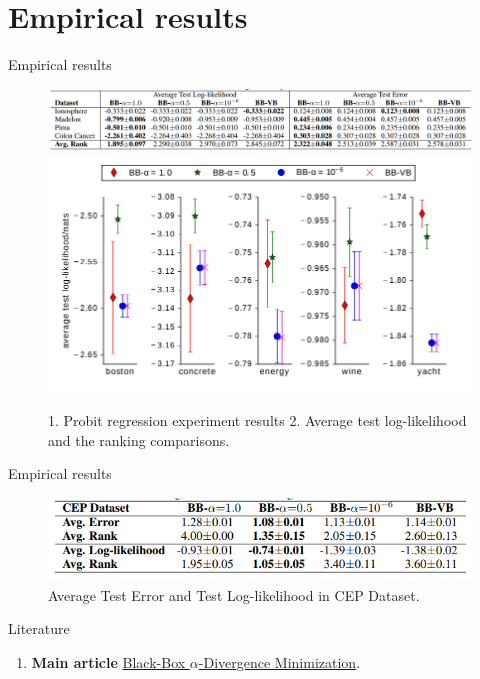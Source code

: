 \documentclass{beamer}
\begin{document}
\section{Empirical results}
\begin{frame}{Empirical results}
    \begin{figure}
        \centering
        \includegraphics[scale=0.62]{images/div_bmm_3.png}
        \includegraphics[scale=0.5]{images/div_bmm_4.png}
        \caption{1. Probit regression experiment results 
        2. Average test log-likelihood and the ranking comparisons.}
        \label{fig:enter-label}
    \end{figure}
\end{frame}

\begin{frame}{Empirical results}
    \begin{figure}
        \centering
        \includegraphics[scale=0.7]{images/div_bmm_5.png}
        \caption{Average Test Error and Test Log-likelihood in CEP Dataset.}
        \label{fig:enter-label}
    \end{figure}
\end{frame}


\begin{frame}{Literature}
    \begin{enumerate}
        \item \textbf{Main article} \href{http://proceedings.mlr.press/v48/hernandez-lobatob16.pdf}
        {Black-Box $\alpha$-Divergence Minimization}.
    \end{enumerate}
\end{frame}
\end{document}
